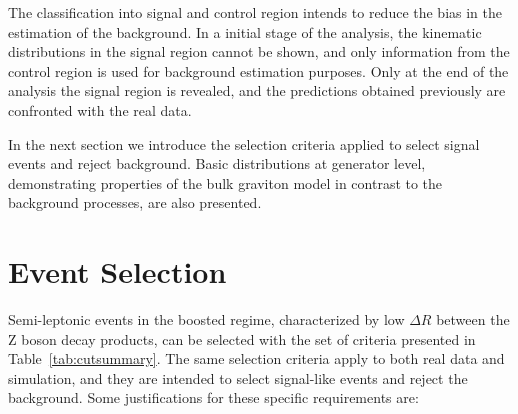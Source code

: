 The classification into signal and control region intends to reduce the bias in the estimation of the background. In a initial stage of the analysis, the kinematic distributions in the signal region cannot be shown, and only information from the control region is used for background estimation purposes. Only at the end of the analysis the signal region is revealed, and the predictions obtained previously are confronted with the real data.  

In the next section we introduce the selection criteria applied to select signal events and reject background. Basic distributions at generator level, demonstrating properties of the bulk graviton model in contrast to the background processes, are also presented.   

\section{Event Selection}

Semi-leptonic events in the boosted regime, characterized by low $\Delta R$ between the Z boson decay products, can be selected with the set of criteria presented in Table~\ref{tab:cutsummary}. The same selection criteria apply to both real data and simulation, and they are intended to select signal-like events and reject the background. Some justifications for these specific requirements are:

